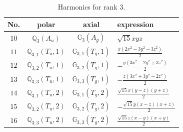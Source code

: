 \documentclass[fleqn,8pt,landscape]{jsarticle}
\begin{document}
\begin{table}[ht!]
\begin{center}
\caption{Harmonics for rank 3.}
\renewcommand{\arraystretch}{1.3}
\begin{tabular}{cccl} \hline \hline
No. & polar & axial & expression \\ \hline
$ 10 $ & $ \mathbb{Q}_{3}(A_{u}) $ & $ \mathbb{G}_{3}(A_{g}) $ & $ \sqrt{15} x y z $ \\
$ 11 $ & $ \mathbb{Q}_{3,1}(T_{u},1) $ & $ \mathbb{G}_{3,1}(T_{g},1) $ & $ \frac{x \left(2 x^{2} - 3 y^{2} - 3 z^{2}\right)}{2} $ \\
$ 12 $ & $ \mathbb{Q}_{3,2}(T_{u},1) $ & $ \mathbb{G}_{3,2}(T_{g},1) $ & $ - \frac{y \left(3 x^{2} - 2 y^{2} + 3 z^{2}\right)}{2} $ \\
$ 13 $ & $ \mathbb{Q}_{3,3}(T_{u},1) $ & $ \mathbb{G}_{3,3}(T_{g},1) $ & $ - \frac{z \left(3 x^{2} + 3 y^{2} - 2 z^{2}\right)}{2} $ \\
$ 14 $ & $ \mathbb{Q}_{3,1}(T_{u},2) $ & $ \mathbb{G}_{3,1}(T_{g},2) $ & $ \frac{\sqrt{15} x \left(y - z\right) \left(y + z\right)}{2} $ \\
$ 15 $ & $ \mathbb{Q}_{3,2}(T_{u},2) $ & $ \mathbb{G}_{3,2}(T_{g},2) $ & $ - \frac{\sqrt{15} y \left(x - z\right) \left(x + z\right)}{2} $ \\
$ 16 $ & $ \mathbb{Q}_{3,3}(T_{u},2) $ & $ \mathbb{G}_{3,3}(T_{g},2) $ & $ \frac{\sqrt{15} z \left(x - y\right) \left(x + y\right)}{2} $ \\
 \hline \hline
\end{tabular}
\end{center}
\end{table}
\end{document}
